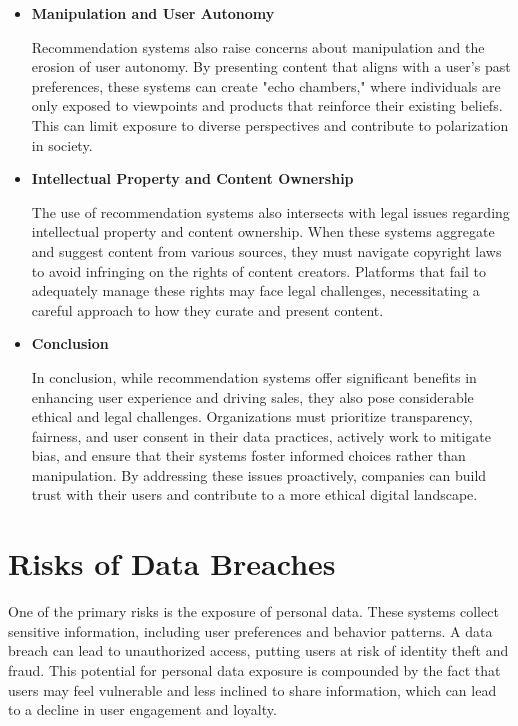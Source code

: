 \documentclass[10pt,twoside,slovak,a4paper]{article}
\begin{document}
\begin{itemize}
\item \textbf{Manipulation and User Autonomy} 

Recommendation systems also raise concerns about manipulation and the erosion of user autonomy\cite{problems}. By presenting content that aligns with a user’s past preferences, these systems can create "echo chambers," where individuals are only exposed to viewpoints and products that reinforce their existing beliefs. This can limit exposure to diverse perspectives and contribute to polarization in society.


\item \textbf{Intellectual Property and Content Ownership} 

The use of recommendation systems also intersects with legal issues regarding intellectual property and content ownership\cite{ethical}. When these systems aggregate and suggest content from various sources, they must navigate copyright laws to avoid infringing on the rights of content creators. Platforms that fail to adequately manage these rights may face legal challenges, necessitating a careful approach to how they curate and present content.

\item \textbf{Conclusion} 

In conclusion, while recommendation systems offer significant benefits in enhancing user experience and driving sales, they also pose considerable ethical and legal challenges. Organizations must prioritize transparency, fairness, and user consent in their data practices, actively work to mitigate bias, and ensure that their systems foster informed choices rather than manipulation. By addressing these issues proactively, companies can build trust with their users and contribute to a more ethical digital landscape.

\end{itemize}



\section{Risks of Data Breaches} \label{Risks of Data Breaches}

One of the primary risks is the exposure of personal data. These systems collect sensitive information, including user preferences and behavior patterns\cite{info}. A data breach can lead to unauthorized access, putting users at risk of identity theft and fraud. This potential for personal data exposure is compounded by the fact that users may feel vulnerable and less inclined to share information, which can lead to a decline in user engagement and loyalty.
\end{document}
